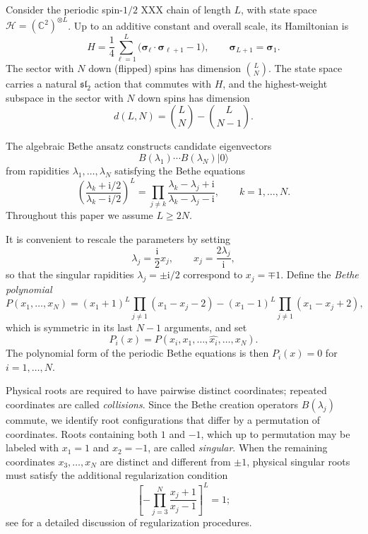 \documentclass[11pt]{article}
\theoremstyle{definition}
\newcommand{\ii}{\mathrm{i}}
\newcommand{\C}{\mathbb{C}}
\begin{document}
Consider the periodic spin-$1/2$ XXX chain of length $L$, with state space
$\mathcal{H}=(\C^2)^{\otimes L}$. Up to an additive constant and overall scale, its Hamiltonian is
\[
H=\frac{1}{4}\sum_{\ell=1}^L
\bigl(\boldsymbol{\sigma}_{\ell}\cdot
\boldsymbol{\sigma}_{\ell+1}-1\bigr),
\qquad \boldsymbol{\sigma}_{L+1}=\boldsymbol{\sigma}_1.
\]
The sector with $N$ down (flipped) spins has dimension $\binom{L}{N}$. The state space carries a natural $\mathfrak{sl}_2$ action
that commutes with $H$, and the highest-weight subspace in the sector with
$N$ down spins has dimension
\begin{equation}\label{eq:target}
	d(L,N)=\binom{L}{N}-\binom{L}{N-1}.
\end{equation}

The algebraic Bethe ansatz constructs candidate eigenvectors
\[
B(\lambda_1)\cdots B(\lambda_N)|0\rangle
\]
from rapidities $\lambda_1,\ldots,\lambda_N$ satisfying the Bethe equations
\begin{equation}\label{eq:bethe}
	\left(\frac{\lambda_k+\ii/2}{\lambda_k-\ii/2}\right)^L
	=
	\prod_{j\ne k}\frac{\lambda_k-\lambda_j+\ii}{\lambda_k-\lambda_j-\ii},
	\qquad k=1,\ldots,N.
\end{equation}
Throughout this paper we assume $L\ge 2N$.

It is convenient to rescale the parameters by setting
\[
\lambda_j=\frac{\ii}{2}x_j,
\qquad x_j=\frac{2\lambda_j}{\ii},
\]
so that the singular rapidities $\lambda_j=\pm\ii/2$ correspond to $x_j=\mp 1$.
Define the \emph{Bethe polynomial}
\begin{equation}\label{eq:polynomial}
	P(x_1,\ldots,x_N)=
	(x_1+1)^L\prod_{j\ne 1}(x_1-x_j-2)
	-
	(x_1-1)^L\prod_{j\ne 1}(x_1-x_j+2),
\end{equation}
which is symmetric in its last $N-1$ arguments, and set
\[
P_i(x)=P(x_i,x_1,\ldots,\widehat{x_i},\ldots,x_N).
\]
The polynomial form of the periodic Bethe equations is then $P_i(x)=0$
for $i=1,\ldots,N$.

Physical roots are required to have pairwise distinct coordinates; repeated
coordinates are called \emph{collisions}. Since the Bethe creation
operators $B(\lambda_j)$ commute, we identify root configurations that differ by a
permutation of coordinates. Roots containing both $1$ and $-1$, which up to permutation may be labeled
with $x_1=1$ and $x_2=-1$, are called \emph{singular}. When the remaining
coordinates $x_3,\ldots,x_N$ are distinct and different from $\pm 1$, physical singular
roots must satisfy the additional regularization condition
\begin{equation}\label{eq:physical}
	\left[-\prod_{j=3}^N
	\frac{x_j+1}{x_j-1}\right]^L=1;
\end{equation}
see \cite{NW2013,NW2014} for a detailed discussion of regularization procedures.
\end{document}
